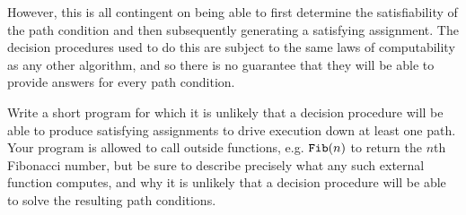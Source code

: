\documentclass[10pt]{article}
\begin{document}
\begin{enumerate}
However, this is all contingent on being able to first determine the satisfiability of the path condition and then subsequently generating a satisfying assignment. The decision procedures used to do this are subject to the same laws of computability as any other algorithm, and so there is no guarantee that they will be able to provide answers for every path condition. 

Write a short program for which it is unlikely that a decision procedure will be able to produce satisfying assignments to drive execution down at least one path. Your program is allowed to call outside functions, e.g. $\texttt{\upshape Fib}(n)$ to return the $n$th Fibonacci number, but be sure to describe precisely what any such external function computes, and why it is unlikely that a decision procedure will be able to solve the resulting path conditions.


%

\newpage

\end{enumerate}
\end{document}
